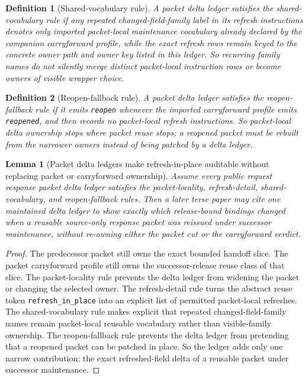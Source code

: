 \documentclass[11pt]{article}
\newtheorem{definition}{Definition}
\newtheorem{lemma}{Lemma}
\begin{document}
\begin{definition}[Shared-vocabulary rule]
A packet delta ledger satisfies the \emph{shared-vocabulary rule} if any repeated changed-field-family label in its refresh instructions denotes only imported packet-local maintenance vocabulary already declared by the companion carryforward profile, while the exact refresh rows remain keyed to the concrete owner path and owner key listed in this ledger.
So recurring family names do not silently merge distinct packet-local instruction rows or become owners of visible wrapper choice.
\end{definition}

\begin{definition}[Reopen-fallback rule]
A packet delta ledger satisfies the \emph{reopen-fallback rule} if it emits \texttt{reopen} whenever the imported carryforward profile emits \texttt{reopened}, and then records no packet-local refresh instructions.
So packet-local delta ownership stops where packet reuse stops; a reopened packet must be rebuilt from the narrower owners instead of being patched by a delta ledger.
\end{definition}

\begin{lemma}[Packet delta ledgers make refresh-in-place auditable without replacing packet or carryforward ownership]
Assume every public request response packet delta ledger satisfies the packet-locality, refresh-detail, shared-vocabulary, and reopen-fallback rules.
Then a later terse paper may cite one maintained delta ledger to show exactly which release-bound bindings changed when a reusable source-only response packet was reissued under successor maintenance, without re-owning either the packet cut or the carryforward verdict.
\end{lemma}

\begin{proof}
The predecessor packet still owns the exact bounded handoff slice.
The packet carryforward profile still owns the successor-release reuse class of that slice.
The packet-locality rule prevents the delta ledger from widening the packet or changing the selected owner.
The refresh-detail rule turns the abstract reuse token \texttt{refresh\_in\_place} into an explicit list of permitted packet-local refreshes.
The shared-vocabulary rule makes explicit that repeated changed-field-family names remain packet-local reusable vocabulary rather than visible-family ownership.
The reopen-fallback rule prevents the delta ledger from pretending that a reopened packet can be patched in place.
So the ledger adds only one narrow contribution: the exact refreshed-field delta of a reusable packet under successor maintenance.\qedhere
\end{proof}
\end{document}
